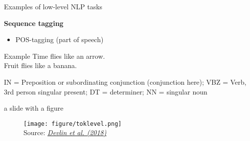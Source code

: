 
\begin{vbframe}{Examples of low-level NLP tasks}


\textbf{Sequence tagging}

\begin{itemize}
	\item POS-tagging (part of speech)
\end{itemize}

\begin{exampleblock}{Example}
		Time flies  like   an   arrow.		\\ Fruit\POS{NN}   flies   like   a   banana.
\end{exampleblock}

\begin{footnotesize}
IN = Preposition or subordinating conjunction (conjunction here); VBZ = Verb, 3rd person singular present; DT = determiner; NN = singular noun
\end{footnotesize}

\vfill

\end{vbframe}


\begin{vbframe}{a slide with a figure}

\vfill

	\begin{figure}
		\centering
		\texttt{[image: figure/toklevel.png]}\\ 
		\footnotesize{Source:} \href{https://arxiv.org/pdf/1810.04805.pdf}{\footnotesize \it Devlin et al. (2018)}
	\end{figure}

\vfill

\end{vbframe}


